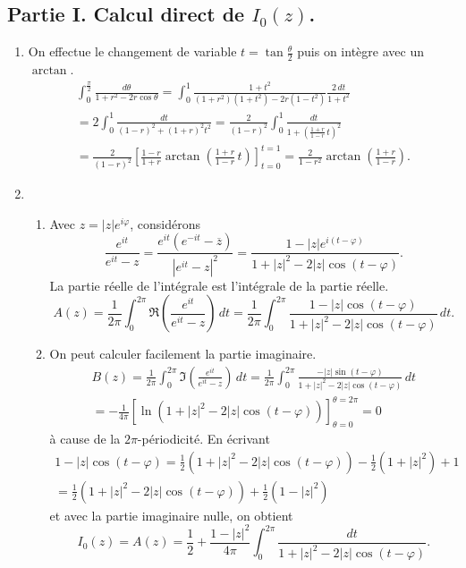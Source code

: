 \subsection*{Partie I. Calcul direct de $I_0(z)$.}
\begin{enumerate}
 \item On effectue le changement de variable $t = \tan \frac{\theta}{2}$ puis on intègre avec un $\arctan$.
\begin{multline*}
\int_0^{\frac{\pi}{2}}\frac{d\theta}{1+r^2 - 2r\cos \theta}
 = \int_{0}^{1}\frac{1+t^2}{(1+r^2)(1+t^2)-2r(1-t^2)}\frac{2\,dt}{1+t^2} \\
 = 2\int_0^1\frac{dt}{(1-r)^2 +(1+r)^2t^2}
 = \frac{2}{(1-r)^2}\int_0^1\frac{dt}{1+\left( \frac{1+r}{1-r}\, t\right)^2 }\\
 = \frac{2}{(1-r)^2} \left[ \frac{1-r}{1+r} \arctan \left( \frac{1+r}{1-r}\, t\right) \right]_{t=0}^{t=1} 
 = \frac{2}{1-r^2} \arctan \left( \frac{1+r}{1-r}\right).
\end{multline*}

 \item
\begin{enumerate}
 \item Avec $z=|z|e^{i\varphi}$, considérons 
\[
 \frac{e^{it}}{e^{it} - z} = \frac{e^{it}(e^{-it} - \overline{z})}{\left| e^{it} - z\right|^2}
 = \frac{1-|z|e^{i(t-\varphi)}}{1 + |z|^2 - 2|z|\cos(t-\varphi)}.
\]
La partie réelle de l'intégrale est l'intégrale de la partie réelle. 
\[
 A(z) = \frac{1}{2\pi}\int_0^{2\pi}\Re\left( \frac{e^{it}}{e^{it} - z}\right) \,dt
 = \frac{1}{2\pi}\int_0^{2\pi}\frac{1-|z|\cos(t-\varphi)}{1 + |z|^2 - 2|z|\cos(t-\varphi)} \,dt.
\]

 \item On peut calculer facilement la partie imaginaire.
\begin{multline*}
 B(z) = \frac{1}{2\pi}\int_0^{2\pi}\Im\left( \frac{e^{it}}{e^{it} - z}\right) \,dt
 = \frac{1}{2\pi}\int_0^{2\pi}\frac{-|z|\sin(t-\varphi)}{1 + |z|^2 - 2|z|\cos(t-\varphi)} \,dt \\
 = -\frac{1}{4\pi} \left[ \ln\left( 1 + |z|^2 - 2|z|\cos(t-\varphi)\right) \right]_{\theta = 0}^{\theta = 2\pi} = 0
\end{multline*}
à cause de la $2\pi$-périodicité.
En écrivant 
\begin{multline*}
 1-|z|\cos(t-\varphi) = \frac{1}{2}\left( 1 + |z|^2 - 2|z|\cos(t-\varphi)\right) - \frac{1}{2}\left( 1 + |z|^2\right) + 1\\
 = \frac{1}{2}\left( 1 + |z|^2 - 2|z|\cos(t-\varphi)\right) + \frac{1}{2}\left( 1 - |z|^2\right)
\end{multline*}
et avec la partie imaginaire nulle, on obtient
\[
 I_0(z) = A(z) = \frac{1}{2}+ \frac{1 - |z|^2}{4\pi}\int_{0}^{2\pi}\frac{dt}{1 + |z|^2 - 2|z|\cos(t-\varphi)}.
\]
\end{enumerate}


\end{enumerate}
